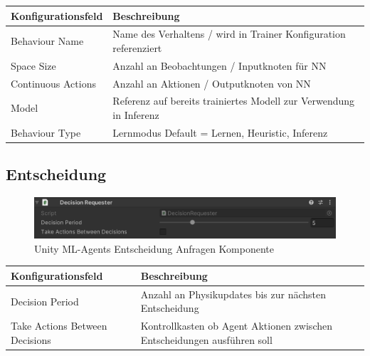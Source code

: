 \begin{center}
{
\begin{tabular}{ |p{4cm}|p{8cm}| }
\hline
Konfigurationsfeld& Beschreibung \\
\hline
Behaviour Name & Name des Verhaltens / wird in Trainer Konfiguration referenziert \\
Space Size & Anzahl an Beobachtungen / Inputknoten für NN \\
Continuous Actions & Anzahl an Aktionen / Outputknoten von NN \\
Model & Referenz auf bereits trainiertes Modell zur Verwendung in Inferenz \\
Behaviour Type & Lernmodus Default = Lernen, Heuristic, Inferenz \\
\hline
\end{tabular}}
\end{center}

\subsection{Entscheidung}
\begin{figure}[H]
  \centering  
  \includegraphics[scale=0.5]{img/entscheidung_anfragen_komponente.png}
  \caption{Unity ML-Agents Entscheidung Anfragen Komponente}
  \label{fig:entscheidung_anfragen_komponente}
\end{figure}

\begin{center}
{
\begin{tabular}{ |p{4cm}|p{8cm}| }
\hline
Konfigurationsfeld& Beschreibung \\
\hline
Decision Period & Anzahl an Physikupdates bis zur nächsten Entscheidung \\
Take Actions Between Decisions &  Kontrollkasten ob Agent Aktionen zwischen Entscheidungen ausführen soll \\
\hline
\end{tabular}}
\end{center}


